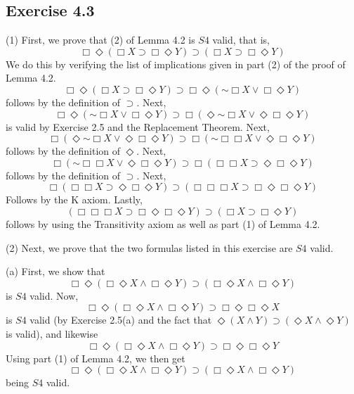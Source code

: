 \documentclass{article}
\newcommand*{\oldneg}{\mathord{\sim}}
\theoremstyle{definition}
\begin{document}
\subsection*{Exercise 4.3}
(1) First, we prove that (2) of Lemma 4.2 is $S4$ valid, that is,
\[ \Box\Diamond(\Box X\supset\Box\Diamond Y)\supset(\Box X\supset\Box\Diamond Y) \] 
We do this by verifying the list of implications given in part (2) of the proof of Lemma 4.2.
\[ \Box\Diamond(\Box X\supset\Box\Diamond Y)\supset\Box\Diamond(\oldneg\Box X\vee\Box\Diamond Y) \]
follows by the definition of $\supset$. Next,
\[ \Box\Diamond(\oldneg\Box X\vee\Box\Diamond Y)\supset\Box(\Diamond\oldneg\Box X\vee\Diamond\Box\Diamond Y) \]
is valid by Exercise 2.5 and the Replacement Theorem. Next,
\[ \Box(\Diamond\oldneg\Box X\vee\Diamond\Box\Diamond Y)\supset\Box(\oldneg\Box\Box X\vee\Diamond\Box\Diamond Y) \]
follows by the definition of $\Diamond$. Next,
\[ \Box(\oldneg\Box\Box X\vee\Diamond\Box\Diamond Y)\supset\Box(\Box\Box X\supset\Diamond\Box\Diamond Y) \]
follows by the definition of $\supset$. Next,
\[ \Box(\Box\Box X\supset\Diamond\Box\Diamond Y)\supset(\Box\Box\Box X\supset\Box\Diamond\Box\Diamond Y) \]
Follows by the K axiom. Lastly,
\[ (\Box\Box\Box X\supset\Box\Diamond\Box\Diamond Y)\supset(\Box X\supset\Box\Diamond Y) \]
follows by using the Transitivity axiom as well as part (1) of Lemma 4.2.

(2) Next, we prove that the two formulas listed in this exercise are $S4$ valid.

(a) First, we show that 
\[ \Box\Diamond (\Box\Diamond X\wedge\Box\Diamond Y)\supset (\Box\Diamond X\wedge\Box\Diamond Y) \] is 
$S4$ valid. Now,
\[ \Box\Diamond (\Box\Diamond X\wedge\Box\Diamond Y)\supset\Box\Diamond\Box\Diamond X \]
is $S4$ valid (by Exercise 2.5(a) and the fact that $\Diamond(X\wedge Y)\supset (\Diamond X\wedge\Diamond Y)$ is valid), 
and likewise
\[ \Box\Diamond (\Box\Diamond X\wedge\Box\Diamond Y)\supset\Box\Diamond\Box\Diamond Y \]
Using part (1) of Lemma 4.2, we then get
\[ \Box\Diamond (\Box\Diamond X\wedge\Box\Diamond Y)\supset(\Box\Diamond X\wedge\Box\Diamond Y) \]
being $S4$ valid.
\end{document}
